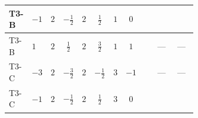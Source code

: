 \documentclass[8pt]{article}
\begin{document}
\begin{landscape}
\begin{longtable}{@{}llcccccc >{\raggedright\arraybackslash}p{0.21\linewidth} >{\raggedright\arraybackslash}p{0.21\linewidth} >{\raggedright\arraybackslash}p{0.21\linewidth}@{}}
T3-B & $-1$ & $2$ & $-\frac{1}{2}$ & $2$ & $\frac{1}{2}$ & $1$ & $0$ & \scriptsize\adjustbox{max width=\linewidth}{$\begin{gathered} +{\lambda_{12}^{(A)}} {\lambda_{HS_1}^{(A)}}\end{gathered}$} & \scriptsize\adjustbox{max width=\linewidth}{$\begin{gathered} +{\lambda_{H H^\dagger S_1^\dagger S_2^\dagger}^{\rm Cross}} (-2 \operatorname{Tr}\!\left({y_1}\,\left({y_2}\right)^{\dagger}\right)-4 (2 \left({\lambda_{H H^\dagger S_1^\dagger S_2^\dagger}^{\rm Cross}}\right)^{*}+\left({\lambda_{10}}\right)^{*}))\end{gathered}$} & \scriptsize\adjustbox{max width=\linewidth}{$\begin{gathered} -2 \left({\lambda_{H H^\dagger S_1^\dagger S_2^\dagger}^{\rm Cross}}\right)^{*} \operatorname{Tr}\!\left({y_2}\,\left({y_1}\right)^{\dagger}\right)\end{gathered}$} \\
\midrule
T3-B & $1$ & $2$ & $\frac{1}{2}$ & $2$ & $\frac{3}{2}$ & $1$ & $1$ & \scriptsize\adjustbox{max width=\linewidth}{$\begin{gathered} +{\lambda_{12}^{(A)}} {\lambda_{HS_1}^{(A)}}\end{gathered}$} & --- & --- \\
\midrule
T3-C & $-3$ & $2$ & $-\frac{3}{2}$ & $2$ & $-\frac{1}{2}$ & $3$ & $-1$ & \scriptsize\adjustbox{max width=\linewidth}{$\begin{gathered} +{\lambda_{12}^{(A)}} {\lambda_{HS_1}^{(A)}}\end{gathered}$} & --- & --- \\
\midrule
T3-C & $-1$ & $2$ & $-\frac{1}{2}$ & $2$ & $\frac{1}{2}$ & $3$ & $0$ & \scriptsize\adjustbox{max width=\linewidth}{$\begin{gathered} +{\lambda_{12}^{(A)}} {\lambda_{HS_1}^{(A)}}\end{gathered}$} & \scriptsize\adjustbox{max width=\linewidth}{$\begin{gathered} +{\lambda_{H H^\dagger S_1^\dagger S_2^\dagger}^{\rm Cross}} (-3 \operatorname{Tr}\!\left({y_1}\,\left({y_2}\right)^{\dagger}\right)-4 (2 \left({\lambda_{H H^\dagger S_1^\dagger S_2^\dagger}^{\rm Cross}}\right)^{*}+\left({\lambda_{10}}\right)^{*}))\end{gathered}$} & \scriptsize\adjustbox{max width=\linewidth}{$\begin{gathered} -3 \left({\lambda_{H H^\dagger S_1^\dagger S_2^\dagger}^{\rm Cross}}\right)^{*} \operatorname{Tr}\!\left({y_2}\,\left({y_1}\right)^{\dagger}\right)\end{gathered}$} \\

\end{longtable}
\end{landscape}
\end{document}
